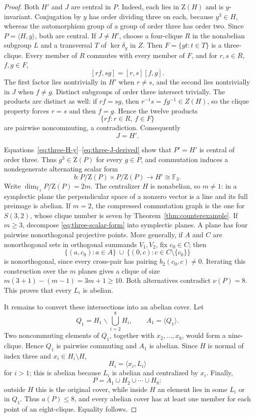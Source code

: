 \documentclass[11pt]{article}
\theoremstyle{remark}
\newcommand{\nuG}{\nu}
\newcommand{\aG}{a}
\newcommand{\F}{\mathbb F}
\newcommand{\Z}{\mathrm Z}
\begin{document}
\begin{proof}
Both $H'$ and $J$ are central in $P$.  Indeed, each lies in $\Z(H)$ and is
$y$-invariant.  Conjugation by $y$ has order dividing three on each,
because $y^3\in H$, whereas the automorphism group of a group of order
three has order two.  Since $P=\langle H,y\rangle$, both are central.
If $J\ne H'$, choose a four-clique $R$ in the nonabelian subgroup $L$ and
a transversal $T$ of $\ker\delta_y$ in $Z$.  Then
$F=\{yt:t\in T\}$ is a three-clique.  Every member of $R$ commutes with
every member of $F$, and for $r,s\in R$, $f,g\in F$,
\[
 [rf,sg]=[r,s][f,g].
\]
The first factor lies nontrivially in $H'$ when $r\ne s$, and the second
lies nontrivially in $J$ when $f\ne g$.  Distinct subgroups of order three
intersect trivially.  The products are distinct as well: if $rf=sg$, then
$r^{-1}s=fg^{-1}\in Z(H)$, so the clique property forces $r=s$ and then
$f=g$.  Hence the twelve products
\[
 \{rf:r\in R,\ f\in F\}
\]
are pairwise noncommuting, a contradiction.  Consequently
\begin{equation}
 J=H'.
\label{eq:three-J-derived}
\end{equation}

Equations~\eqref{eq:three-H-y}--\eqref{eq:three-J-derived} show that
$P'=H'$ is central of order three.  Thus
$g^3\in\Z(P)$ for every $g\in P$, and commutation induces a nondegenerate
alternating scalar form
\begin{equation}
 b:P/\Z(P)\times P/\Z(P)\longrightarrow H'\cong\F_3.
\label{eq:three-scalar-form}
\end{equation}
Write $\dim_{\F_3}P/\Z(P)=2m$.  The centralizer $H$ is nonabelian, so
$m\ne1$: in a symplectic plane the perpendicular space of a nonzero vector
is a line and its full preimage is abelian.  If $m=2$, the compressed
commutation graph is the one for $S(3,2)$, whose clique number is seven by
Theorem~\ref{thm:counterexample}.  If $m\ge3$, decompose
\eqref{eq:three-scalar-form} into
symplectic planes.  A plane has four pairwise nonorthogonal projective
points.  More generally, if $A$ and $C$ are nonorthogonal sets in
orthogonal summands $V_1,V_2$, fix $c_0\in C$; then
\[
 \{(a,c_0):a\in A\}\ \cup\
 \{(0,c):c\in C\setminus\{c_0\}\}
\]
is nonorthogonal, since every cross-pair has pairing
$b_2(c_0,c)\ne0$.  Iterating this construction over the $m$ planes gives
a clique of size $m(3+1)-(m-1)=3m+1\ge10$.  Both alternatives contradict
$\nuG(P)=8$.  This proves that every $L_i$ is abelian.

It remains to convert these intersections into an abelian cover.  Let
\[
 Q_1=H_1\mathbin{\backslash}\bigcup_{i=2}^8H_i,
 \qquad A_1=\langle Q_1\rangle.
\]
Two noncommuting elements of $Q_1$, together with
$x_2,\ldots,x_8$, would form a nine-clique.  Hence $Q_1$ is pairwise
commuting and $A_1$ is abelian.  Since $H$ is normal of index three and
$x_i\in H_i\setminus H$,
\[
 H_i=\langle x_i,L_i\rangle
\]
for $i>1$; this is abelian because $L_i$ is abelian and centralized by
$x_i$.  Finally,
\[
 P=A_1\cup H_2\cup\cdots\cup H_8:
\]
outside $H$ this is the original cover, while inside $H$ an element lies
in some $L_i$ or in $Q_1$.  Thus $\aG(P)\le8$, and every abelian cover
has at least one member for each point of an eight-clique.  Equality follows.
\end{proof}
\end{document}
